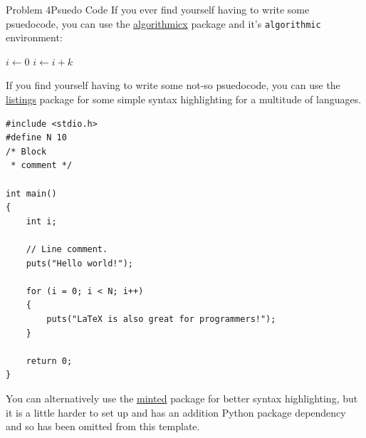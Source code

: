 \documentclass[11pt]{article}
\begin{document}
\begin{question}{Problem 4}{Psuedo Code}
  If you ever find yourself having to write some psuedocode, you can use the
  \href{https://en.wikibooks.org/wiki/LaTeX/Algorithms#Typesetting_using_the_algorithmicx_package}{algorithmicx}
  package and it's \texttt{algorithmic} environment:\\
  \begin{algorithmic}
    \State $i\gets 0$
    \Else
    \State $i\gets i+k$
    \EndIf
    \EndIf
  \end{algorithmic}

  \bigskip
    
  If you find yourself having to write some not-so psuedocode, you can use the
  \href{https://en.wikibooks.org/wiki/LaTeX/Source_Code_Listings}{listings}
  package for some simple syntax highlighting for a multitude of languages.
\begin{lstlisting}[frame=single]
#include <stdio.h>
#define N 10
/* Block
 * comment */

int main()
{
    int i;

    // Line comment.
    puts("Hello world!");
    
    for (i = 0; i < N; i++)
    {
        puts("LaTeX is also great for programmers!");
    }

    return 0;
}
\end{lstlisting}
You can alternatively use the
\href{https://www.sharelatex.com/learn/Code_Highlighting_with_minted}{minted}
package for better syntax highlighting, but it is a little harder to
set up and has an addition Python package dependency and so has
been omitted from this template.
  
\end{question}
\end{document}
